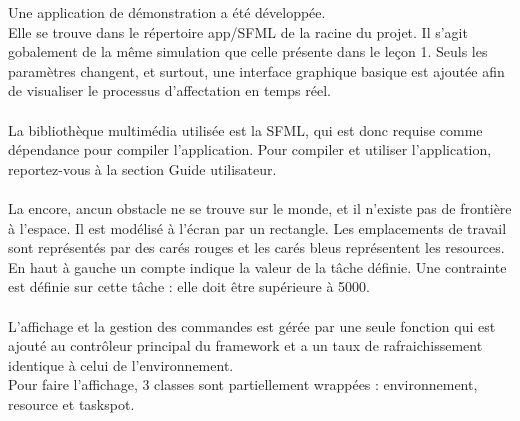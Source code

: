Une application de démonstration a été développée.\\
Elle se trouve dans le répertoire app/SFML de la racine du projet. Il s'agit gobalement de la même simulation que celle présente dans le leçon 1. Seuls les paramètres changent, et surtout, une interface graphique basique est ajoutée afin de visualiser le processus d'affectation en temps réel.\\\\

La bibliothèque multimédia utilisée est la SFML, qui est donc requise comme dépendance pour compiler l'application. Pour compiler et utiliser l'application, reportez-vous à la section Guide utilisateur.\\\\

La encore, ancun obstacle ne se trouve sur le monde, et il n'existe pas de frontière à l'espace. Il est modélisé à l'écran par un rectangle. Les emplacements de travail sont représentés par des carés rouges et les carés bleus représentent les resources.\\
En haut à gauche un compte indique la valeur de la tâche définie. Une contrainte est définie sur cette tâche : elle doit être supérieure à 5000.\\\\

L'affichage et la gestion des commandes est gérée par une seule fonction qui est ajouté au contrôleur principal du framework et a un taux de rafraichissement identique à celui de l'environnement.\\
Pour faire l'affichage, 3 classes sont partiellement wrappées : environnement, resource et taskspot.\\\\

